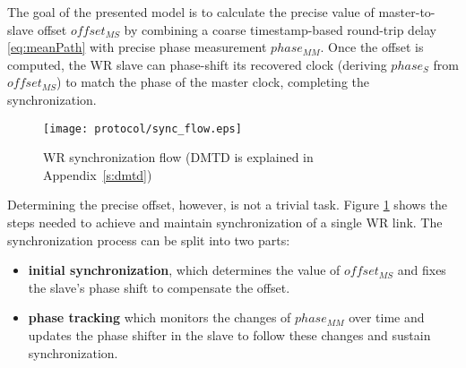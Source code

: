 The goal of the presented model is to calculate the precise value of
master-to-slave offset $offset_{MS}$ by combining a coarse timestamp-based
round-trip delay \eqref{eq:meanPath} with precise phase measurement
$phase_{MM}.$ Once the offset is computed, the WR slave can phase-shift its
recovered clock (deriving $phase_{S}$ from $offset_{MS}$) to match the phase
of the master clock, completing the synchronization.
\begin{figure}[ht!]
  \centering
  \texttt{[image: protocol/sync\_flow.eps]}
  \caption{WR synchronization flow (DMTD is explained in Appendix~\ref{s:dmtd})}
  \label{fig:sync_flow}
\end{figure}
Determining the precise offset, however, is not a trivial task. Figure
\ref{fig:sync_flow} shows the steps needed to achieve and maintain
synchronization of a single WR link. The synchronization process can be
split into two parts: \begin{itemize}
\item \textbf{initial synchronization}, which determines the value of
$offset_{MS}$ and fixes the slave's phase shift to compensate the offset.
\item \textbf{phase tracking} which monitors the changes of $phase_{MM}$
over time and updates the phase shifter in the slave to follow these changes
and sustain synchronization.
\end{itemize}

\newpage

